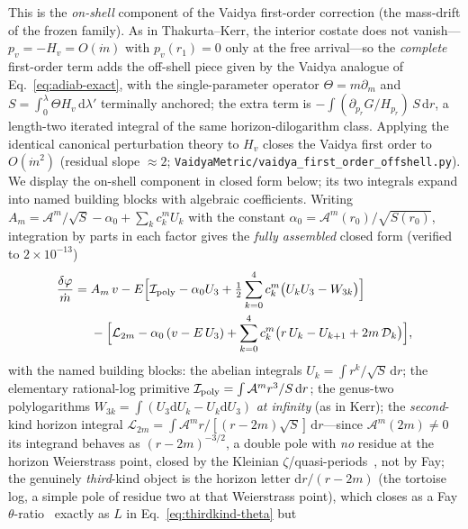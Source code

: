 \documentclass[12pt]{iopart}
\newcommand{\dd}{\mathrm{d}}
\begin{document}
This is the \emph{on-shell} component of the Vaidya first-order correction (the
mass-drift of the frozen family). As in Thakurta--Kerr, the interior costate does not
vanish---$p_v=-H_v=O(\dot m)$ with $p_v(r_1)=0$ only at the free arrival---so the
\emph{complete} first-order term adds the off-shell piece given by the Vaidya analogue
of Eq.~\eqref{eq:adiab-exact}, with the single-parameter operator $\Theta=m\partial_m$
and $S=\int_0^\lambda\Theta H_v\,\dd\lambda'$ terminally anchored; the extra term is
$-\!\int(\partial_{p_r}G/H_{p_r})\,S\,\dd r$, a length-two iterated integral of the
same horizon-dilogarithm class. Applying the identical canonical perturbation theory
to $H_v$ closes the Vaidya first order to $O(\dot m^2)$ (residual slope $\approx2$;
\texttt{VaidyaMetric/vaidya\_first\_order\_offshell.py}). We display the on-shell
component in closed form below;
its two integrals expand into named building blocks with algebraic coefficients.
Writing $A_m=\mathcal{A}^m/\sqrt S-\alpha_0+\sum_k c_k^m U_k$ with the constant
$\alpha_0=\mathcal{A}^m(r_0)/\sqrt{S(r_0)}$, integration by parts in each factor gives
the \emph{fully assembled} closed form (verified to $2\times10^{-13}$)
\begin{equation}
\begin{aligned}
    \frac{\delta\varphi}{\dot m}
    ={}&A_m\,v
    -E\Big[\mathcal{I}_{\rm poly}-\alpha_0 U_3
        +\tfrac12\sum_{k=0}^4 c_k^m\big(U_kU_3-W_{3k}\big)\Big]\\
    &{}-\Big[\mathcal{L}_{2m}-\alpha_0\,(v-E\,U_3)
        +\sum_{k=0}^4 c_k^m\big(r\,U_k-U_{k+1}+2m\,\mathcal{D}_k\big)\Big],
\end{aligned}
    \label{eq:vaidya-full}
\end{equation}
with the named building blocks: the abelian integrals $U_k=\int r^k/\sqrt S\,\dd r$;
the elementary rational-log primitive
$\mathcal{I}_{\rm poly}=\int\mathcal{A}^m r^3/S\,\dd r$; the genus-two
polylogarithms $W_{3k}=\int(U_3\dd U_k-U_k\dd U_3)$ \emph{at infinity} (as in Kerr);
the \emph{second}-kind horizon integral
$\mathcal{L}_{2m}=\int\mathcal{A}^m r/[(r-2m)\sqrt S]\,\dd r$---since
$\mathcal{A}^m(2m)\ne0$ its integrand behaves as $(r-2m)^{-3/2}$, a double pole with
\emph{no} residue at the horizon Weierstrass point, closed by the Kleinian
$\zeta$/quasi-periods~\cite{BuchstaberEnolskii1997,BakerAbelian1897}, not by Fay; the
genuinely \emph{third}-kind object is the horizon letter $\dd r/(r-2m)$ (the tortoise
log, a simple pole of residue two at that Weierstrass point), which closes as a Fay
$\theta$-ratio~\cite{Fay1973} exactly as $L$ in Eq.~\eqref{eq:thirdkind-theta} but
\end{document}
